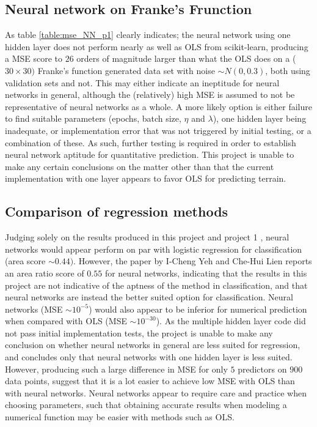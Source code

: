 \documentclass[%
oneside,                 %
final,                   %
10pt]{article}
\begin{document}
\subsection{Neural network on Franke's Frunction}
As table \ref{table:mse_NN_p1} clearly indicates; the neural network using one hidden layer does not perform nearly as well as OLS from scikit-learn, producing a MSE score to $26$ orders of magnitude larger than what the OLS does on a ($30 \times 30)$ Franke's function generated data set with noise $\sim N(0,0.3)$, both using validation sets and not. This may either indicate an ineptitude for neural networks in general, although the (relatively) high MSE is assumed to not be representative of neural networks as a whole. A more likely option is either failure to find suitable parameters (epochs, batch size, $\eta$ and $\lambda$), one hidden layer being inadequate, or implementation error that was not triggered by initial testing, or a combination of these. As such, further testing is required in order to establish neural network aptitude for quantitative prediction. This project is unable to make any certain conclusions on the matter other than that the current implementation with one layer appears to favor OLS for predicting terrain.

\subsection{Comparison of regression methods}
Judging solely on the results produced in this project and project 1 \cite{P1_JN}, neural networks would appear perform on par with logistic regression for classification (area score $\sim 0.44)$. However, the paper by I-Cheng Yeh and Che-Hui Lien \cite{YCCC} reports an area ratio score of $0.55$ for neural networks, indicating that the results in this project are not indicative of the aptness of the method in classification, and that neural networks are instead the better suited option for classification. Neural networks (MSE $\sim  10^{-5} $) would also appear to be inferior for numerical prediction when compared with OLS (MSE $ \sim  10^{-30} $). As the multiple hidden layer code did not pass initial implementation tests, the project is unable to make any conclusion on whether neural networks in general are less suited for regression, and concludes only that neural networks with one hidden layer is less suited. However, producing such a large difference in MSE for only $5$ predictors on $900$ data points, suggest that it is a lot easier to achieve low MSE with OLS than with neural networks. Neural networks  appear to require care and practice when choosing parameters, such that obtaining accurate results when modeling a numerical function may be easier with methods such as OLS.
\end{document}
